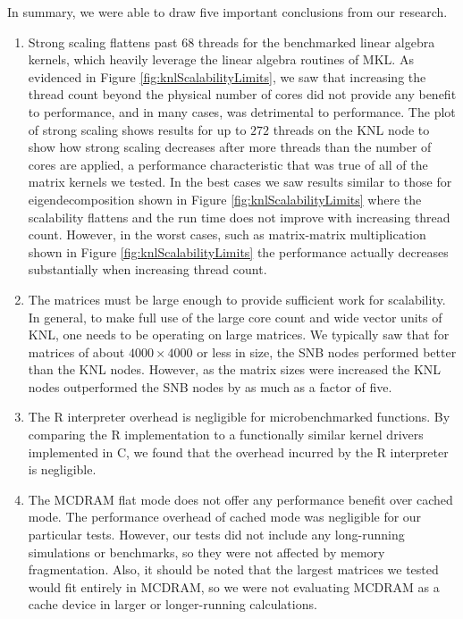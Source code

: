 In summary, we were able to draw five important conclusions from our research.
\begin{enumerate}
\item Strong scaling flattens past 68 threads for the benchmarked linear algebra kernels,
which heavily leverage the linear algebra routines of MKL. As evidenced in Figure
\ref{fig:knlScalabilityLimits}, we saw that increasing the thread count beyond the
physical number of cores did not provide any benefit to performance, and in many cases,
was detrimental to performance. The plot of strong scaling shows results for up to $272$
threads on the KNL node to show how strong scaling decreases after more threads than the
number of cores are applied, a performance characteristic that was true of all of the
matrix kernels we tested. In the best cases we saw results similar to those for
eigendecomposition shown in Figure \ref{fig:knlScalabilityLimits} where the scalability
flattens and the run time does not improve with increasing thread count. However, in the
worst cases, such as matrix-matrix multiplication shown in Figure
\ref{fig:knlScalabilityLimits} the performance actually decreases substantially when
increasing thread count.

\item The matrices must be large enough to provide sufficient work for scalability. In
general, to make full use of the large core count and wide vector units of KNL, one needs
to be operating on large matrices. We typically saw that for matrices of about $4000\times
4000$ or less in size, the SNB nodes performed better than the KNL nodes. However, as the
matrix sizes were increased the KNL nodes outperformed the SNB nodes by as much as a
factor of five.

\item The R interpreter overhead is negligible for microbenchmarked functions. By
comparing the R implementation to a functionally similar kernel drivers implemented in C,
we found that the overhead incurred by the R interpreter is negligible.

\item The MCDRAM flat mode does not offer any performance benefit over cached mode. The
performance overhead of cached mode was negligible for our particular tests. However, our
tests did not include any long-running simulations or benchmarks, so they were not
affected by memory fragmentation. Also, it should be noted that the largest matrices we
tested would fit entirely in MCDRAM, so we were not evaluating MCDRAM as a cache device in
larger or longer-running calculations.


\end{enumerate}
